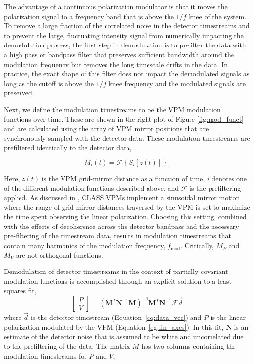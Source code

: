 \documentclass[twocolumn, tighten, numberedappendix, twocolappendix]{aastex63}
\begin{document}
The advantage of a continuous polarization modulator is that it moves the polarization signal to a frequency band that is above the $1/f$ knee of the system. To remove a large fraction of the correlated noise in the detector timestreams and to prevent the large, fluctuating intensity signal from numerically impacting the demodulation process, the first step in demodulation is to prefilter the data with a high pass or bandpass filter that preserves sufficient bandwidth around the modulation frequency but removes the long timescale drifts in the data. In practice, the exact shape of this filter does not impact the demodulated signals as long as the cutoff is above the $1/f$ knee frequency and the modulated signals are preserved.

Next, we define the modulation timestreams to be the VPM modulation functions over time. These are shown in the right plot of Figure \ref{fig:mod_funct} and are calculated using the array of VPM mirror positions that are synchronously sampled with the detector data. These modulation timestreams are prefiltered identically to the detector data,

\begin{equation}
    M_{i}(t) = \mathcal{F} \left\{ S_{i}\left[z(t) \right]\right\}.
\label{eq:mod_time}
\end{equation}

\noindent Here, $z(t)$ is the VPM grid-mirror distance as a function of time, $i$ denotes one of the different modulation functions described above, and $\mathcal{F}$ is the prefiltering applied. As discussed in \cite{harr18}, CLASS VPMs implement a sinusoidal mirror motion where the range of grid-mirror distances traversed by the VPM is set to maximize the time spent observing the linear polarization. Choosing this setting, combined with the effects of decoherence across the detector bandpass and the necessary pre-filtering of the timestream data, results in modulation timestreams that contain many harmonics of the modulation frequency, $f_\mathrm{mod}$. Critically, $M_{P}$ and $M_{V}$ are not orthogonal functions.

Demodulation of detector timestreams in the context of partially covariant modulation functions is accomplished through an explicit solution to a least-squares fit, 
\begin{equation}
\begin{bmatrix} P \\ V \end{bmatrix} = (\mathbf{M}^T \mathbf{N}^{-1} \mathbf{M})^{-1} \mathbf{M}^T \mathbf{N}^{-1}  \mathcal{F}\vec{d}    
\label{eq:least_sqr}
\end{equation}
\noindent where $\vec{d}$ is the detector timestream (Equation~\ref{eq:data_vec}) and $P$ is the linear polarization modulated by the VPM (Equation~\ref{eg:lin_axes}). In this fit, $\mathbf{N}$ is an estimate of the detector noise that is assumed to be white and uncorrelated due to the prefiltering of the data. The matrix $M$ has two columns containing the modulation timestreams for ${P}$ and ${V}$,
\end{document}
